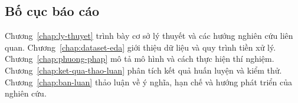 \subsection{Bố cục báo cáo}
Chương~\ref{chap:ly-thuyet} trình bày cơ sở lý thuyết và các hướng nghiên cứu liên quan. Chương~\ref{chap:dataset-eda} giới thiệu dữ liệu và quy trình tiền xử lý. Chương~\ref{chap:phuong-phap} mô tả mô hình và cách thực hiện thí nghiệm. Chương~\ref{chap:ket-qua-thao-luan} phân tích kết quả huấn luyện và kiểm thử. Chương~\ref{chap:ban-luan} thảo luận về ý nghĩa, hạn chế và hướng phát triển của nghiên cứu.
